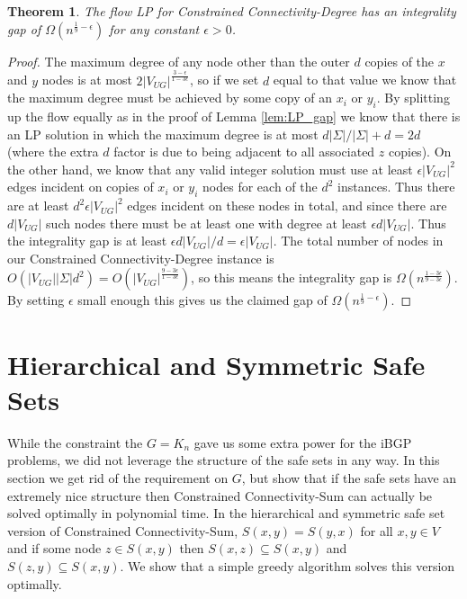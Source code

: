 \documentclass[11pt,letterpaper]{article}
\newtheorem{theorem}{Theorem}[section]
\theoremstyle{definition}
\begin{document}
\begin{theorem} \label{thm:degree_gap}
The flow LP for {\sc Constrained Connectivity-Degree} has an integrality gap of $\Omega(n^{\frac19 - \epsilon})$ for any constant $\epsilon > 0$.
\end{theorem}
\begin{proof}
The maximum degree of any node other than the outer $d$ copies of the $x$ and $y$ nodes is at most $2 |V_{UG}|^{\frac{3-\epsilon}{1-3\epsilon}}$, so if we set $d$ equal to that value we know that the maximum degree must be achieved by some copy of an $x_i$ or $y_i$.  By splitting up the flow equally as in the proof of Lemma \ref{lem:LP_gap} we know that there is an LP solution in which the maximum degree is at most $d|\Sigma| / |\Sigma| + d = 2d$ (where the extra $d$ factor is due to being adjacent to all associated $z$ copies).  On the other hand, we know that any valid integer solution must use at least $\epsilon |V_{UG}|^2$ edges incident on copies of $x_i$ or $y_i$ nodes for each of the $d^2$ instances.  Thus there are at least $d^2 \epsilon |V_{UG}|^2$ edges incident on these nodes in total, and since there are $d|V_{UG}|$ such nodes there must be at least one with degree at least $\epsilon d |V_{UG}|$.  Thus the integrality gap is at least $\epsilon d |V_{UG}| / d = \epsilon |V_{UG}|$.  The total number of nodes in our {\sc Constrained Connectivity-Degree} instance is $O(|V_{UG}| |\Sigma| d^2) = O(|V_{UG}|^{\frac{9-3\epsilon}{1-3\epsilon}})$, so this means the integrality gap is $\Omega(n^{\frac{1-3\epsilon}{9-3\epsilon}})$.  By setting $\epsilon$ small enough this gives us the claimed gap of $\Omega(n^{\frac19-\epsilon})$.
\end{proof}






\section{Hierarchical and Symmetric Safe Sets} \label{sec:hierarchical}

While the constraint the $G = K_n$ gave us some extra power for the iBGP problems, we did not leverage the structure of the safe sets in any way.  In this section we get rid of the requirement on $G$, but show that if the safe sets have an extremely nice structure then {\sc Constrained Connectivity-Sum} can actually be solved optimally in polynomial time.  In the
hierarchical and symmetric safe set version of {\sc Constrained Connectivity-Sum}, $S(x,y) = S(y,x)$ for all $x,y \in V$ and
if some node $z \in S(x,y)$ then $S(x,z) \subseteq S(x,y)$ and $S(z,y)
\subseteq S(x,y)$.  We show that a simple greedy algorithm solves this
version optimally.
\end{document}
